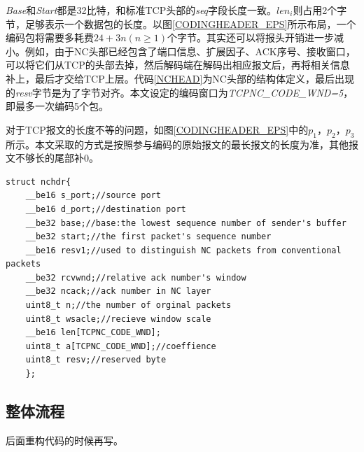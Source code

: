 \par
\emph{Base}和\emph{Start}都是32比特，和标准TCP头部的\emph{seq}字段长度一致。$len_{i}$则占用2个字节，足够表示一个数据包的长度。以图\ref{CODINGHEADER_EPS}所示布局，一个编码包将需要多耗费$24+3n\left(n \ge 1\right)$个字节。其实还可以将报头开销进一步减小。例如，由于NC头部已经包含了端口信息、扩展因子、ACK序号、接收窗口，可以将它们从TCP的头部去掉，然后解码端在解码出相应报文后，再将相关信息补上，最后才交给TCP上层。代码\ref{NCHEAD}为NC头部的结构体定义，最后出现的\emph{resv}字节是为了字节对齐。本文设定的编码窗口为\emph{TCPNC\_CODE\_WND=5}，即最多一次编码5个包。
\par
对于TCP报文的长度不等的问题，如图\ref{CODINGHEADER_EPS}中的$p_{1}$，$p_{2}$，$p_{3}$所示。本文采取的方式是按照参与编码的原始报文的最长报文的长度为准，其他报文不够长的尾部补0。
	\begin{lstlisting}[float,caption=NC头部结构,label={NCHEAD},language={[ANSI]C}]
	struct nchdr{
	__be16 s_port;//source port
	__be16 d_port;//destination port
	__be32 base;//base:the lowest sequence number of sender's buffer
	__be32 start;//the first packet's sequence number
	__be16 resv1;//used to distinguish NC packets from conventional packets
	__be32 rcvwnd;//relative ack number's window
	__be32 ncack;//ack number in NC layer
	uint8_t n;//the number of orginal packets
	uint8_t wsacle;//recieve window scale
	__be16 len[TCPNC_CODE_WND];
	uint8_t a[TCPNC_CODE_WND];//coeffience
	uint8_t resv;//reserved byte
	};
	\end{lstlisting}
\subsection{整体流程}\label{ztlc}%
后面重构代码的时候再写。
